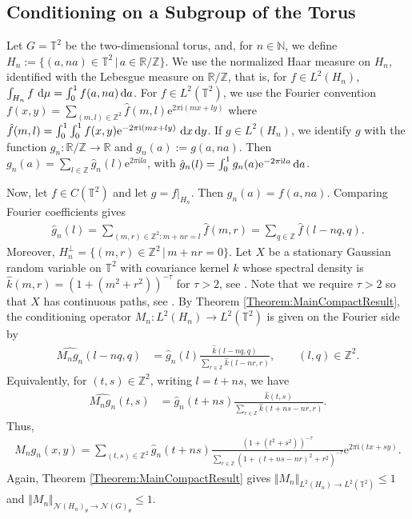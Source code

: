 \documentclass{article}
\renewcommand{\i}{\mathrm{i}}
\renewcommand{\d}{\, \textup{d}}
\newcommand{\T}{\mathbb{T}}
\newcommand{\N}{\mathbb{N}}
\newcommand{\R}{\mathbb{R}}
\newcommand{\Z}{\mathbb{Z}}
\newcommand{\e}{\mathrm{e}}
\begin{document}
\subsection{Conditioning on a Subgroup of the Torus}
Let $G=\mathbb{T}^2$ be the two-dimensional torus, and, for $n \in \N$, we define $H_n:=\{ (a,na) \in \T^2 \, \vert \, a \in \R / \Z \}$. 
We use the normalized Haar measure on $H_n$, identified with the Lebesgue measure on $\mathbb R/\mathbb Z$, that is, for $f \in L^2(H_n)$, $\int_{H_n} f \, \d \mu =\int_0^1 f(a,na)  \d a$. 
For $f\in L^2(\mathbb T^2)$, we use the Fourier convention $f(x,y)=\sum_{(m,l) \in \Z^2} \hat{f}(m,l) \e^{2 \pi \i (mx+ly)}$ where $\hat{f}(m,l)= \int_0^1 \int_0^1 f(x,y) \e^{-2\pi \i (mx+ly)} \, \d x  \d y$. If $g\in L^2(H_n)$, we identify $g$ with the function $g_n: \R/\Z \to \R$ and $g_n(a):=g(a,na)$. Then $g_n(a)=\sum_{l \in \Z} \hat{g}_n(l) \e^{2\pi \i l a}$, with $\hat{g}_n(l)=\int_0^1 g_n(a) \e^{-2\pi \i la } \d a$. 

Now, let $f \in C(\T^2)$ and let $g=f|_{H_n}$. Then $g_n(a)=f(a,na)$. Comparing Fourier coefficients gives 
\begin{align*}
    \hat{g}_n(l)=\sum_{(m,r) \in \Z^2: m+nr=l} \hat{f}(m,r)= \sum_{q \in \Z} \hat{f}(l-nq,q).
\end{align*}
Moreover, $H_n^\perp=\{ (m,r) \in \Z^2 \, \vert \, m+nr=0\}$. Let $X$ be a stationary Gaussian random variable on $\T^2$ with covariance kernel $k$ whose spectral density is $\hat{k}(m,r)=(1+(m^2+r^2))^{-\tau}$ for $\tau>2$, see \cite{Slava2020}. Note that we require $\tau>2$ so that $X$ has continuous paths, see \cite[Theorem 4.1]{steinwart2024paths}.
By Theorem \ref{Theorem:MainCompactResult}, the conditioning operator $M_n:L^2(H_n) \to L^2(\T^2)$ is given on the Fourier side by
\begin{align*}
    \widehat{M_n g_n}(l-nq,q)&= \hat{g}_n(l) \frac{\hat{k}(l-nq,q)}{\sum_{r \in \Z} \hat{k}(l-nr,r)}, \qquad  (l,q) \in \Z^2.
\end{align*}
Equivalently, for $(t,s) \in \Z^2$, writing $l=t+ns$, we have 
\begin{align*}
        \widehat{M_n g_n}(t,s)&= \hat{g}_n(t+ns) \frac{\hat{k}(t,s)}{\sum_{r \in \Z} \hat{k}(t+ns-nr,r)}.
\end{align*}
Thus,
\begin{align*}
    M_n g_n (x,y)= \sum_{(t,s) \in \Z^2} \hat{g}_n(t+ns) \frac{(1+(t^2+s^2))^{-\tau}}{\sum_{r \in \Z} (1+(t+ns-nr)^2+r^2)^{-\tau}} \mathrm{e}^{2 \pi \i (tx+sy)}.
\end{align*}
Again, Theorem \ref{Theorem:MainCompactResult} gives $\Vert M_n \Vert_{L^2(H_n) \to L^2(\T^2)} \leq 1$ and $\Vert M_n \Vert_{\mathcal{N}(H_n)_\theta \to \mathcal{N}(G)_\theta} \leq 1$. 
\end{document}
